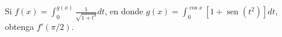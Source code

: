 \item Si $\displaystyle f(x) = \int_0^{g(x)} \frac{1}{\sqrt{1 + t^3}} dt$, en donde $\displaystyle g(x) = \int_0^{\cos x} [1 + \operatorname{sen}(t^2)] dt$, obtenga $f'(\pi/2)$.
